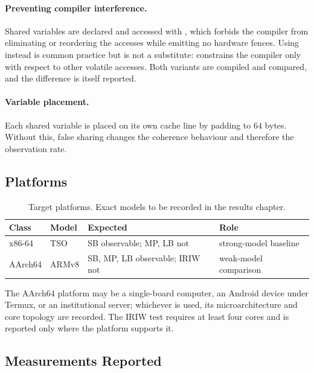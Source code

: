 \paragraph{Preventing compiler interference.} Shared variables are declared
 and accessed with , which forbids the
compiler from eliminating or reordering the accesses while emitting no hardware
fences.
Using  instead is common practice but is not a substitute:
 constrains the compiler only with respect to other volatile
accesses.
Both variants are compiled and compared, and the difference is itself
reported.

\paragraph{Variable placement.} Each shared variable is placed on its own cache
line by padding to $64$ bytes.
Without this, false sharing changes the coherence
behaviour and therefore the observation rate.

\subsection{Platforms}

\begin{table}[H]
\centering
\small
\caption{Target platforms. Exact models to be recorded in the results chapter.}
\label{tab:platforms}
\begin{tabular}{@{}llll@{}}
\toprule
\textbf{Class} & \textbf{Model} & \textbf{Expected} & \textbf{Role} \\
\midrule
x86-64  & TSO      & SB observable; MP, LB not & strong-model baseline \\
AArch64 & ARMv8    & SB, MP, LB observable; IRIW not & weak-model comparison \\
\bottomrule
\end{tabular}
\end{table}

The AArch64 platform may be a single-board computer, an Android device under
Termux, or an institutional server; whichever is used, its microarchitecture and
core topology are recorded. The IRIW test requires at least four cores and is
reported only where the platform supports it.

\subsection{Measurements Reported}

